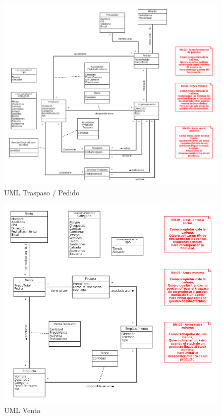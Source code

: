 \begin{figure}[H]
	\includegraphics[width=\linewidth]{images/UML-traspaso-pedido.png}
	\caption{UML Traspaso / Pedido}
\end{figure}

\begin{figure}[H]
	\includegraphics[width=\linewidth]{images/UML-venta.png}
	\caption{UML Venta}
\end{figure}

